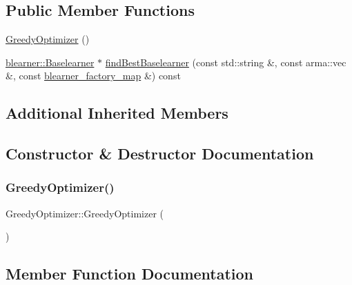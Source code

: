 \subsection*{Public Member Functions}
\begin{DoxyCompactItemize}
\item 
\mbox{\hyperlink{classoptimizer_1_1_greedy_optimizer_a86fd72eb73c5ade01321b7da50529ecb}{Greedy\+Optimizer}} ()
\item 
\mbox{\hyperlink{classblearner_1_1_baselearner}{blearner\+::\+Baselearner}} $\ast$ \mbox{\hyperlink{classoptimizer_1_1_greedy_optimizer_a5551f9dd7135e3a4acc68ac585be3146}{find\+Best\+Baselearner}} (const std\+::string \&, const arma\+::vec \&, const \mbox{\hyperlink{baselearner__factory__list_8h_a058570e00ae11b882cfed36eb40be025}{blearner\+\_\+factory\+\_\+map}} \&) const
\end{DoxyCompactItemize}
\subsection*{Additional Inherited Members}


\subsection{Constructor \& Destructor Documentation}
\mbox{\label{classoptimizer_1_1_greedy_optimizer_a86fd72eb73c5ade01321b7da50529ecb}} 
\subsubsection{\texorpdfstring{Greedy\+Optimizer()}{GreedyOptimizer()}}
{\footnotesize\ttfamily Greedy\+Optimizer\+::\+Greedy\+Optimizer (\begin{DoxyParamCaption}{ }\end{DoxyParamCaption})}



\subsection{Member Function Documentation}
\mbox{\label{classoptimizer_1_1_greedy_optimizer_a5551f9dd7135e3a4acc68ac585be3146}} 
